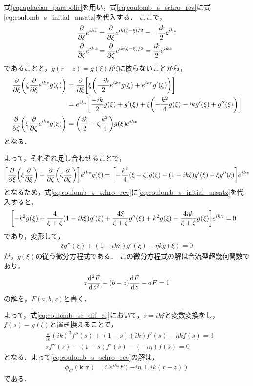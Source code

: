 \documentclass[a4paper,11pt]{ltjsarticle}
\begin{document}
式\ref{eq:laplacian_parabolic}を用い，式\ref{eq:coulomb_s_schro_rev}に式\ref{eq:coulomb_s_initial_ansatz}を代入する．
ここで，
\begin{align*}
  &\pdv{\xi} e^{ikz} = \pdv{\xi} e^{ik(\zeta-\xi)/2} = - \frac{ik}{2} e^{ikz}\\
  &\pdv{\zeta} e^{ikz} =   \pdv{\zeta} e^{ik(\zeta-\xi)/2} =  \frac{ik}{2} e^{ikz}
\end{align*}
であることと，$g(r-z) = g(\xi)$が$\zeta$に依らないことから，
\begin{align*}
  \pdv{\xi}\qty(\xi \pdv{\xi} e^{ikz}g(\xi)) 
  &= \pdv{\xi}\qty[\xi\qty(\frac{-ik}{2}e^{ikz}g(\xi) + e^{ikz}g'(\xi))] \\
  &=e^{ikz}\qty[\frac{-ik}{2} g(\xi) + g'(\xi) + \xi\qty(-\frac{k^2}{4} g(\xi) - ikg'(\xi) + g''(\xi))] \\
  \pdv{\zeta}\qty(\zeta \pdv{\zeta} e^{ikz} g(\xi)) &= \qty( \frac{ik}{2}  - \zeta \frac{k^2}{4})g(\xi)e^{ikz}
\end{align*}
となる．

よって，それぞれ足し合わせることで，
\begin{align*}
  \qty[\pdv{\xi}\qty(\xi\pdv{\xi}) + \pdv{\zeta}\qty(\zeta\pdv{\zeta})]e^{ikz} g(\xi)
  = \qty[ - \frac{k^2}{4}(\xi+\zeta)g(\xi) + \qty(1 - ik\xi )g'(\xi) + \xi g''(\xi)] e^{ikz}
\end{align*}
となるため，式\ref{eq:coulomb_s_schro_rev}に\ref{eq:coulomb_s_initial_ansatz}を代入すると，
\begin{align}\label{eq:scat_sol_dif_eq}
&\qty[-k^2 g(\xi) + \frac{4}{\xi + \zeta} \qty(1-ik\xi )g'(\xi) + \frac{4\xi}{\xi+ \zeta}g''(\xi) + k^2g(\xi) - \frac{4\eta k}{\xi + \zeta} g(\xi)] e^{ikz} = 0 
\end{align}
であり，変形して，
\begin{align}\label{eq:coulomb_sc_dif_eq}
  \xi g''(\xi) + (1 - ik\xi) g'(\xi) - \eta k g(\xi) = 0
\end{align}
が，$g(\xi)$の従う微分方程式である．
この微分方程式の解は合流型超幾何関数であり，
\begin{align}\label{eq:cofluent_hyp_geom_dif}
  z \dv[2]{F}{z} + (b - z) \dv{F}{z} - aF = 0
\end{align}
の解を，$F(a,b,z)$と書く．

よって，式\ref{eq:coulomb_sc_dif_eq}において，$s = ik\xi$と変数変換をし，$f(s) = g(\xi)$と置き換えることで，
\begin{align*}
  &\frac{s}{ik} (ik)^2 f''(s) + (1 - s) (ik) f'(s) - \eta k f(s) = 0 \\
  & s f''(s) + (1-s) f'(s) - (- i \eta) f(s)  = 0
\end{align*}
となる．よって\ref{eq:coulomb_s_schro_rev}の解は，
\begin{align}\label{eq:coulomb_sc_solution}
  \phi_C(\bm{k};\bm{r}) = C e^{ikz} F(-i\eta, 1, ik(r-z))
\end{align}
である．
\end{document}
